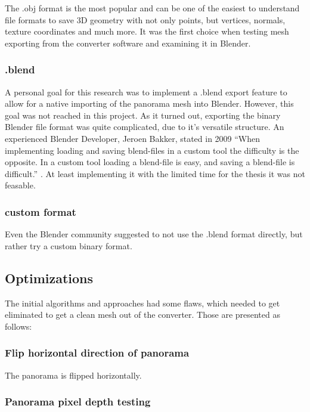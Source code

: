 The .obj format is the most popular and can be one of the easiest to understand file formats to save 3D geometry with not only points, but vertices, normals, texture coordinates and much more. It was the first choice when testing mesh exporting from the converter software and examining it in Blender.

\subsubsection{.blend}

A personal goal for this research was to implement a .blend export feature to allow for a native importing of the panorama mesh into Blender. However, this goal was not reached in this project. As it turned out, exporting the binary Blender file format was quite complicated, due to it's versatile structure. An experienced Blender Developer, Jeroen Bakker, stated in 2009 “When implementing loading and saving blend-files in a custom tool the difficulty is the opposite. In a custom tool loading a blend-file is easy, and saving a blend-file is difficult.” \parencite[see]{webMysteryOfTheBlend}. At least implementing it with the limited time for the thesis it was not feasable.



\subsubsection{custom format}

Even the Blender community suggested to not use the .blend format directly, but rather try a custom binary format. \parencite[compare]{webBlenderArtistsBlendExport}


\subsection{Optimizations}

The initial algorithms and approaches had some flaws, which needed to get eliminated to get a clean mesh out of the converter. Those are presented as follows:

\subsubsection{Flip horizontal direction of panorama}

The panorama is flipped horizontally.

\subsubsection{Panorama pixel depth testing}

